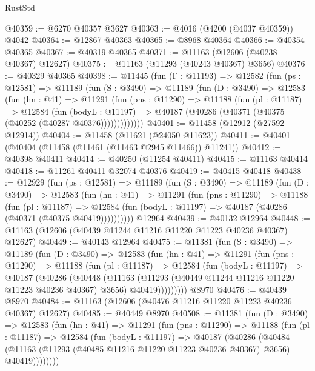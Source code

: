 \begin{lexlean}{RustStd}
\begin{coremodule}
@40359 := @6270 @40357 @3627
@40363 := @4016 (@4200 (@4037 @40359)) @4042
@40364 := @12867 @40363
@40365 := @8968 @40364
@40366 := @40354 @40365
@40367 := @40319 @40365
@40371 := @11163 (@12606 (@40238 @40367) @12627)
@40375 := @11163 (@11293 (@40243 @40367) @3656)
@40376 := @40329 @40365
@40398 := @11445
    (fun (Γ : @11193) =>
    @12582
      (fun (ps : @12581) =>
      @11189
        (fun (S : @3490) =>
        @11189
          (fun (D : @3490) =>
          @12583
            (fun (hn : @41) =>
            @11291
              (fun (pns : @11290) =>
              @11188
                (fun (pl : @11187) =>
                @12584
                  (fun (bodyL : @11197) =>
                  @40187 (@40286 (@40371 (@40375 (@40252 (@40287 @40376)))))))))))))
@40401 := @11458 (@12912 (@27592 @12914))
@40404 := @11458 (@11621 (@24050 @11623))
@40411 := @40401 (@40404 (@11458 (@11461 (@11463 @2945 @11466)) @11241))
@40412 := @40398 @40411
@40414 := @40250 (@11254 @40411)
@40415 := @11163 @40414
@40418 := @11261 @40411 @32074 @40376
@40419 := @40415 @40418
@40438 := @12929
    (fun (ps : @12581) =>
    @11189
      (fun (S : @3490) =>
      @11189
        (fun (D : @3490) =>
        @12583
          (fun (hn : @41) =>
          @11291
            (fun (pns : @11290) =>
            @11188
              (fun (pl : @11187) =>
              @12584 (fun (bodyL : @11197) => @40187 (@40286 (@40371 (@40375 @40419))))))))))
    @12964
@40439 := @40132 @12964
@40448 := @11163 (@12606 (@40439 @11244 @11216 @11220 @11223 @40236 @40367) @12627)
@40449 := @40143 @12964
@40475 := @11381
    (fun (S : @3490) =>
    @11189
      (fun (D : @3490) =>
      @12583
        (fun (hn : @41) =>
        @11291
          (fun (pns : @11290) =>
          @11188
            (fun (pl : @11187) =>
            @12584
              (fun (bodyL : @11197) =>
              @40187
                (@40286
                  (@40448
                    (@11163
                      (@11293 (@40449 @11244 @11216 @11220 @11223 @40236 @40367) @3656)
                      @40419)))))))))
    @8970
@40476 := @40439 @8970
@40484 := @11163 (@12606 (@40476 @11216 @11220 @11223 @40236 @40367) @12627)
@40485 := @40449 @8970
@40508 := @11381
    (fun (D : @3490) =>
    @12583
      (fun (hn : @41) =>
      @11291
        (fun (pns : @11290) =>
        @11188
          (fun (pl : @11187) =>
          @12584
            (fun (bodyL : @11197) =>
            @40187
              (@40286
                (@40484
                  (@11163 (@11293 (@40485 @11216 @11220 @11223 @40236 @40367) @3656) @40419))))))))

\end{coremodule}
\end{lexlean}
